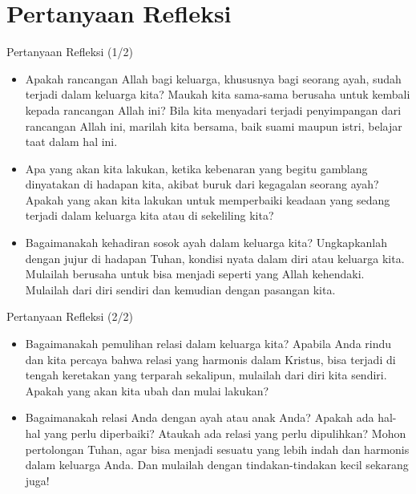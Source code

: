 \documentclass{beamer}
\theoremstyle{mystyle}
\begin{document}
\section{Pertanyaan Refleksi}
\begin{frame}{Pertanyaan Refleksi (1/2)}
	\begin{itemize}
		\item<2-> Apakah rancangan Allah bagi keluarga, khususnya bagi seorang ayah, sudah terjadi dalam keluarga kita? Maukah kita sama-sama berusaha untuk kembali kepada rancangan Allah ini? Bila kita menyadari terjadi penyimpangan dari rancangan Allah ini, marilah kita bersama, baik suami maupun istri, belajar taat dalam hal ini.
		\item<3-> Apa yang akan kita lakukan, ketika kebenaran yang begitu gamblang dinyatakan di hadapan kita, akibat buruk dari kegagalan seorang ayah? Apakah yang akan kita lakukan untuk memperbaiki keadaan yang sedang terjadi dalam keluarga kita atau di sekeliling kita?
		\item<4-> Bagaimanakah kehadiran sosok ayah dalam keluarga kita? Ungkapkanlah dengan jujur di hadapan Tuhan, kondisi nyata dalam diri atau keluarga kita. Mulailah berusaha untuk bisa menjadi seperti yang Allah kehendaki. Mulailah dari diri sendiri dan kemudian dengan pasangan
		kita.
	\end{itemize}
\end{frame}

\begin{frame}{Pertanyaan Refleksi (2/2)}
	\begin{itemize}
		\item<2-> Bagaimanakah pemulihan relasi dalam keluarga kita? Apabila Anda rindu dan kita percaya bahwa relasi yang harmonis dalam Kristus, bisa terjadi di tengah keretakan yang terparah sekalipun, mulailah dari diri kita sendiri. Apakah yang akan kita ubah dan mulai lakukan?
		\item<3-> Bagaimanakah relasi Anda dengan ayah atau anak Anda? Apakah ada hal-hal yang perlu diperbaiki? Ataukah ada relasi yang perlu dipulihkan? Mohon pertolongan Tuhan, agar bisa menjadi sesuatu yang lebih indah dan harmonis dalam keluarga Anda. Dan mulailah dengan
		tindakan-tindakan kecil sekarang juga!
	\end{itemize}
\end{frame}
\end{document}
